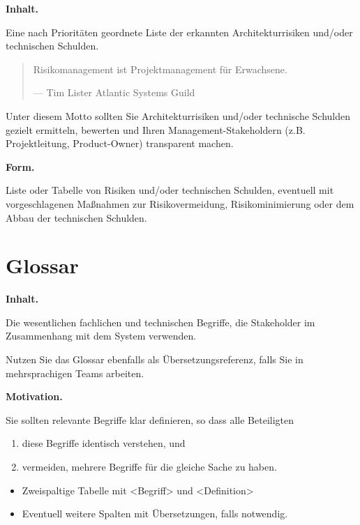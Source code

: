 \documentclass[]{article}
\begin{document}
\textbf{Inhalt.}

Eine nach Prioritäten geordnete Liste der erkannten Architekturrisiken
und/oder technischen Schulden.

\begin{quote}
Risikomanagement ist Projektmanagement für Erwachsene.

---  Tim Lister Atlantic Systems Guild
\end{quote}

Unter diesem Motto sollten Sie Architekturrisiken und/oder technische
Schulden gezielt ermitteln, bewerten und Ihren Management-Stakeholdern
(z.B. Projektleitung, Product-Owner) transparent machen.

\textbf{Form.}

Liste oder Tabelle von Risiken und/oder technischen Schulden, eventuell
mit vorgeschlagenen Maßnahmen zur Risikovermeidung, Risikominimierung
oder dem Abbau der technischen Schulden.

\hypertarget{section-glossary}{%
\section{Glossar}\label{section-glossary}}

\textbf{Inhalt.}

Die wesentlichen fachlichen und technischen Begriffe, die Stakeholder im
Zusammenhang mit dem System verwenden.

Nutzen Sie das Glossar ebenfalls als Übersetzungsreferenz, falls Sie in
mehrsprachigen Teams arbeiten.

\textbf{Motivation.}

Sie sollten relevante Begriffe klar definieren, so dass alle Beteiligten

\begin{enumerate}
\def\labelenumi{\arabic{enumi}.}
\item
  diese Begriffe identisch verstehen, und
\item
  vermeiden, mehrere Begriffe für die gleiche Sache zu haben.
\end{enumerate}

\begin{itemize}
\item
  Zweispaltige Tabelle mit \textless{}Begriff\textgreater{} und
  \textless{}Definition\textgreater{}
\item
  Eventuell weitere Spalten mit Übersetzungen, falls notwendig.
\end{itemize}
\end{document}

